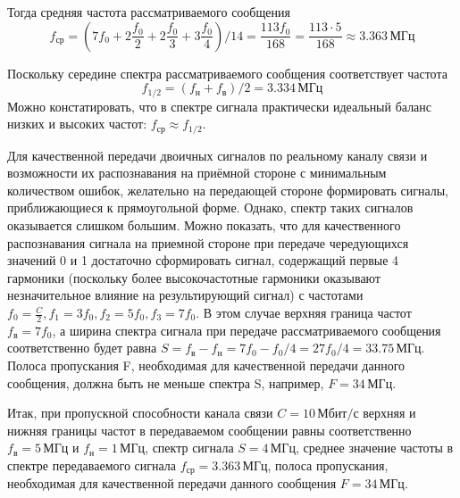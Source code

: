 Тогда средняя частота рассматриваемого сообщения
\[
	f_{\text{ср}} = \left(7f_0+2\frac{f_0}{2}+2\frac{f_0}{3}+3\frac{f_0}{4}\right)/ 14 = \frac{113f_0}{168} = \frac{113 \cdot 5}{168} \approx 3.363 \, \text{МГц}
\]

Поскольку середине спектра рассматриваемого сообщения соответствует частота
\[
	f_{1/2} = (f_{\text{н}} + f_{\text{в}}) /2 = 3.334 \, \text{МГц}
\]
Можно констатировать, что в спектре сигнала практически идеальный баланс низких и высоких частот: $f_{\text{ср}} \approx f_{1/2}$.

Для качественной передачи двоичных сигналов по реальному каналу связи и возможности их распознавания на приёмной стороне с минимальным количеством ошибок, желательно на передающей стороне формировать сигналы, приближающиеся к прямоугольной форме. Однако, спектр таких сигналов оказывается слишком большим. Можно показать, что для качественного распознавания сигнала на приемной стороне при передаче чередующихся значений 0 и 1 достаточно сформировать сигнал, содержащий первые 4 гармоники (поскольку более высокочастотные гармоники оказывают незначительное влияние на результирующий сигнал) с частотами $f_0=\frac{C}{2}, f_1=3f_0, f_2=5f_0, f_3=7f_0$. В этом случае верхняя граница частот $f_{\text{в}}=7f_0$, а ширина спектра сигнала при передаче рассматриваемого сообщения соответственно будет равна $S = f_{\text{в}} - f_{\text{н}} = 7f_0-f_0/4=27f_0/4=33.75 \, \text{МГц}$. Полоса пропускания F, необходимая для качественной передачи данного сообщения, должна быть не меньше спектра S, например, $F = 34 \, \text{МГц}$.

Итак, при пропускной способности канала связи $C = 10 \, \text{Мбит/с}$ верхняя и нижняя границы частот в передаваемом сообщении равны соответственно $f_{\text{в}} = 5 \, \text{МГц}$ и $f_{\text{н}} = 1 \, \text{МГц}$, спектр сигнала $S = 4 \, \text{МГц}$, среднее значение частоты в спектре передаваемого сигнала $f_{\text{ср}} = 3.363 \, \text{МГц}$, полоса пропускания, необходимая для качественной передачи данного сообщения $F=34 \, \text{МГц}$.
